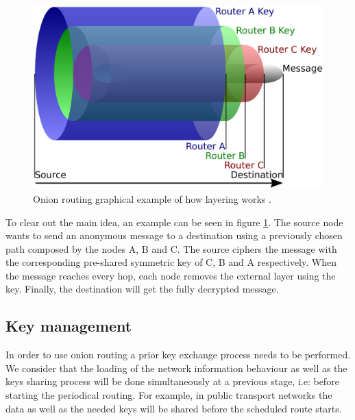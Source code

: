 \begin{figure}[hbt]
  \centering
  \includegraphics[scale=0.35]{imgs/onion}
  \caption{Onion routing graphical example of how layering works \cite{wiki-onion-routing-image}.}
  \label{fig:dtn-example}
\end{figure}

To clear out the main idea, an example can be seen in figure \ref{fig:dtn-example}. The source node wants to send an anonymous message to a destination using a previously chosen path composed by the nodes A, B and C. The source ciphers the message with the corresponding pre-shared symmetric key of C, B and A respectively. When the message reaches every hop, each node removes the external layer using the key. Finally, the destination will get the fully decrypted message.

\subsection{Key management}

In order to use onion routing a prior key exchange process needs to be performed. We consider that the loading of the network information behaviour as well as the keys sharing process will be done simultaneously at a previous stage, i.e: before starting the periodical routing. For example, in public transport networks the data as well as the needed keys will be shared before the scheduled route starts.
